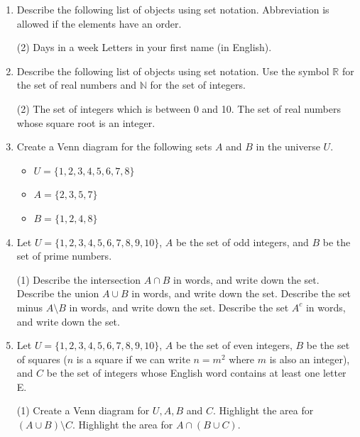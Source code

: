 \begin{enumerate}
\item Describe the following list of objects using set notation. Abbreviation is allowed if the elements have an order.
\begin{tasks}[after-skip = 50pt](2)
\task Days in a week
\task Letters in your first name (in English).
\end{tasks}

\item Describe the following list of objects using set notation. Use the symbol $\mathbb{R}$ for the set of real numbers and $\mathbb{N}$ for the set of integers.
\begin{tasks}[after-skip = 50pt](2)
\task The set of integers which is between 0 and 10.
\task The set of real numbers whose square root is an integer.
\end{tasks}

\item Create a Venn diagram for the following sets $A$ and $B$ in the universe $U$.
\begin{itemize}
\item $U = \{1,2,3,4,5,6,7,8\}$
\item $A = \{2,3,5,7\}$
\item $B = \{1,2,4,8\}$
\end{itemize}
\vspace{50pt}

\item Let $U = \{1,2,3,4,5,6,7,8,9,10\}$, $A$ be the set of odd integers, and $B$ be the set of prime numbers.

\begin{tasks}[after-item-skip = 50pt, after-skip = 50pt](1)
\task Describe the intersection $A \cap B$ in words, and write down the set.
\task Describe the union $A \cup B$ in words, and write down the set.
\task Describe the set minus $A \setminus B$ in words, and write down the set.
\task Describe the set $A^c$ in words, and write down the set.
\end{tasks}

\newpage
\item Let $U = \{1,2,3,4,5,6,7,8,9,10\}$, $A$ be the set of even integers, $B$ be the set of squares ($n$ is a square if we can write $n = m^2$ where $m$ is also an integer), and $C$ be the set of integers whose English word contains at least one letter E.

\begin{tasks}[after-item-skip = 0pt, after-skip = 100pt](1)
\task Create a Venn diagram for $U, A, B$ and $C$.
\task Highlight the area for $(A \cup B) \setminus C$.
\task Highlight the area for $A \cap (B \cup C)$.
\end{tasks}

\end{enumerate}